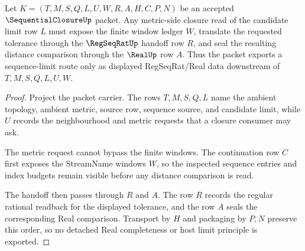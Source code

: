 \begin{theorem}
\label{thm:sequential-closure-regseqrat-limit-route}
Let $K=(T,M,S,Q,L,U,W,R,A,H,C,P,N)$ be an accepted $\SequentialClosureUp$ packet. Any metric-side closure read of the candidate limit row $L$ must expose the finite window ledger $W$, translate the requested tolerance through the $\RegSeqRatUp$ handoff row $R$, and seal the resulting distance comparison through the $\RealUp$ row $A$. Thus the packet exports a sequence-limit route only as displayed RegSeqRat/Real data downstream of $T,M,S,Q,L,U,W$.
\end{theorem}
\begin{proof}
Project the packet carrier. The rows $T,M,S,Q,L$ name the ambient topology, ambient metric, source row, sequence source, and candidate limit, while $U$ records the neighbourhood and metric requests that a closure consumer may ask.

The metric request cannot bypass the finite windows. The continuation row $C$ first exposes the StreamName windows $W$, so the inspected sequence entries and index budgets remain visible before any distance comparison is read.

The handoff then passes through $R$ and $A$. The row $R$ records the regular rational readback for the displayed tolerance, and the row $A$ seals the corresponding Real comparison. Transport by $H$ and packaging by $P,N$ preserve this order, so no detached Real completeness or host limit principle is exported.
\end{proof}

